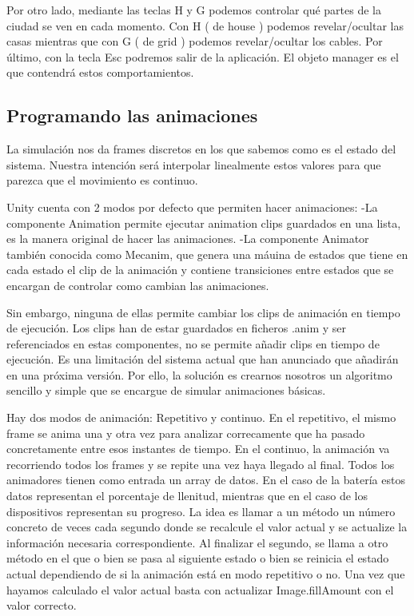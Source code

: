 \documentclass[12pt,a4paper,openright,oneside]{article}
\numberwithin{equation}{section}
\theoremstyle{definition}
\begin{document}
Por otro lado, mediante las teclas H y G podemos controlar qué partes de la ciudad se ven en cada momento. Con H ( de house ) podemos revelar/ocultar las casas mientras que con G ( de grid ) podemos revelar/ocultar los cables. Por último, con la tecla Esc podremos salir de la aplicación. El objeto manager es el que contendrá estos comportamientos.

\subsection{Programando las animaciones}
La simulación nos da frames discretos en los que sabemos como es el estado del sistema. Nuestra intención será interpolar linealmente estos valores para que parezca que el movimiento es continuo. 

Unity cuenta con 2 modos por defecto que permiten hacer animaciones:
-La componente Animation permite ejecutar animation clips guardados en una lista, es la manera original de hacer las animaciones.
-La componente Animator también conocida como Mecanim, que genera una máuina de estados que tiene en cada estado el clip de la animación y contiene transiciones entre estados que se encargan de controlar como cambian las animaciones.

Sin embargo, ninguna de ellas permite cambiar los clips de animación en tiempo de ejecución. Los clips han de estar guardados en ficheros .anim y ser referenciados en estas componentes, no se permite añadir clips en tiempo de ejecución. Es una limitación del sistema actual que han anunciado que añadirán en una próxima versión. Por ello, la solución es crearnos nosotros un algoritmo sencillo y simple que se encargue de simular animaciones básicas.

Hay dos modos de animación: Repetitivo y continuo. En el repetitivo, el mismo frame se anima una y otra vez para analizar correcamente que ha pasado concretamente entre esos instantes de tiempo. En el continuo, la animación va recorriendo todos los frames y se repite una vez haya llegado al final.
Todos los animadores tienen como entrada un array de datos. En el caso de la batería estos datos representan el porcentaje de llenitud, mientras que en el caso de los dispositivos representan su progreso. La idea es llamar a un método un número concreto de veces cada segundo donde se recalcule el valor actual y se actualize la información necesaria correspondiente. Al finalizar el segundo, se llama a otro método en el que o bien se pasa al siguiente estado o bien se reinicia el estado actual dependiendo de si la animación está en modo repetitivo o no.
Una vez que hayamos calculado el valor actual basta con actualizar Image.fillAmount con el valor correcto.
\end{document}
